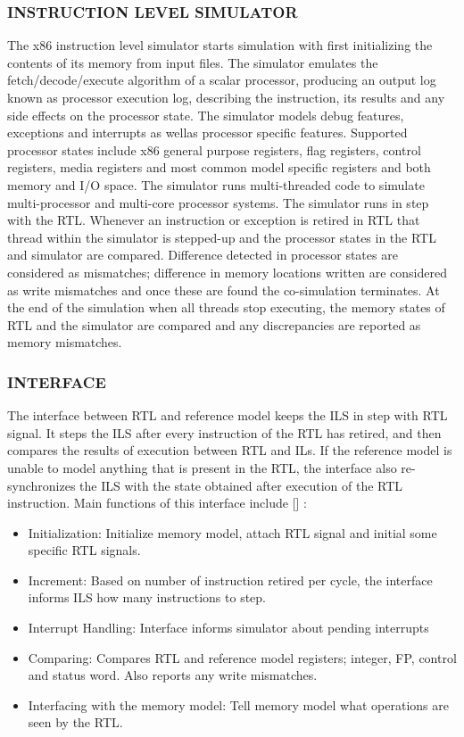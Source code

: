 \subsubsection {INSTRUCTION LEVEL SIMULATOR}
The x86 instruction level simulator starts simulation with first initializing the contents of its memory from input files. The simulator emulates the fetch/decode/execute algorithm of a scalar processor, producing an output log known as processor execution log, describing the instruction, its results and any side effects on the processor state. The simulator models debug features, exceptions and interrupts as wellas processor specific features. Supported processor states include x86 general purpose registers, flag registers, control registers, media registers and most common model specific registers and both memory and I/O space. The simulator runs multi-threaded code to simulate multi-processor and multi-core processor systems. 
The simulator runs in step with the RTL. Whenever an instruction or exception is retired in RTL that thread within the simulator is stepped-up and the processor states in the RTL and simulator are compared. Difference detected in processor states are considered as mismatches; difference in memory locations written are considered as write mismatches and once these are found the co-simulation terminates. At the end of the simulation when all threads stop executing, the memory states of RTL and the simulator are compared and any discrepancies are reported as memory mismatches.

\subsubsection {INTERFACE}
The interface between RTL and reference model keeps the ILS in step with RTL signal. It steps the ILS after every instruction of the RTL has retired, and then compares the results of execution between RTL and ILs. If the reference model is unable to model anything that is present in the RTL, the interface also re-synchronizes the ILS with the state obtained after execution of the RTL instruction.
Main functions of this interface include [] :
\begin{itemize}
	\item Initialization: Initialize memory model, attach RTL signal and initial some specific RTL signals.
	\item Increment: Based on number of instruction retired per cycle, the interface informs ILS how many instructions to step.
	\item Interrupt Handling: Interface informs simulator about pending interrupts
	\item Comparing: Compares RTL and reference model registers; integer, FP, control and status word. Also reports any write mismatches. 
	\item Interfacing with the memory model: Tell memory model what operations are seen by the RTL. 
\end{itemize}

